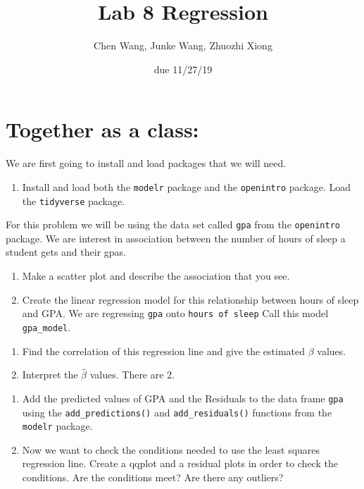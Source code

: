 \documentclass[]{article}
\title{Lab 8 Regression}
\author{Chen Wang, Junke Wang, Zhuozhi Xiong}
\date{due 11/27/19}
\providecommand{\tightlist}{%
  \setlength{\itemsep}{0pt}\setlength{\parskip}{0pt}}
\begin{document}
\maketitle

\hypertarget{together-as-a-class}{%
\section{Together as a class:}\label{together-as-a-class}}

We are first going to install and load packages that we will need.

\begin{enumerate}
\def\labelenumi{\arabic{enumi}.}
\tightlist
\item
  Install and load both the \texttt{modelr} package and the
  \texttt{openintro} package. Load the \texttt{tidyverse} package.
\end{enumerate}

For this problem we will be using the data set called \texttt{gpa} from
the \texttt{openintro} package. We are interest in association between
the number of hours of sleep a student gets and their gpas.

\begin{enumerate}
\def\labelenumi{\arabic{enumi}.}
\setcounter{enumi}{1}
\item
  Make a scatter plot and describe the association that you see.
\item
  Create the linear regression model for this relationship between hours
  of sleep and GPA. We are regressing \texttt{gpa} onto
  \texttt{hours\ of\ sleep} Call this model \texttt{gpa\_model}.
\end{enumerate}

\newpage

\begin{enumerate}
\def\labelenumi{\arabic{enumi}.}
\setcounter{enumi}{3}
\item
  Find the correlation of this regression line and give the estimated
  \(\beta\) values.
\item
  Interpret the \(\hat{\beta}\) values. There are 2.
\end{enumerate}

\newpage

\begin{enumerate}
\def\labelenumi{\arabic{enumi}.}
\setcounter{enumi}{5}
\item
  Add the predicted values of GPA and the Residuals to the data frame
  \texttt{gpa} using the \texttt{add\_predictions()} and
  \texttt{add\_residuals()} functions from the \texttt{modelr} package.
\item
  Now we want to check the conditions needed to use the least squares
  regression line. Create a qqplot and a residual plots in order to
  check the conditions. Are the conditions meet? Are there any outliers?
\end{enumerate}
\end{document}
